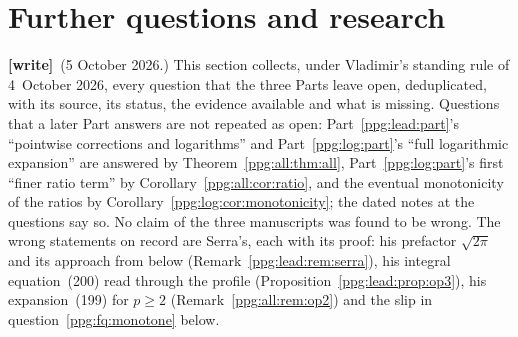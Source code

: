 \documentclass[11pt,letterpaper]{article}
\theoremstyle{remark}\newtheorem{remark}[theorem]{Remark}
\numberwithin{equation}{section}
\newcommand{\wtag}{\textup{\textbf{[write]}}}
\begin{document}
\section{Further questions and research}\label{ppg:sec:further}
\wtag\ (5 October 2026.) This section collects, under Vladimir's standing rule of 4~October 2026, every question that the three Parts leave open, deduplicated, with its source, its status, the evidence available and what is missing. Questions that a later Part answers are not repeated as open: Part~\ref{ppg:lead:part}'s ``pointwise corrections and logarithms'' and Part~\ref{ppg:log:part}'s ``full logarithmic expansion'' are answered by Theorem~\ref{ppg:all:thm:all}, Part~\ref{ppg:log:part}'s first ``finer ratio term'' by Corollary~\ref{ppg:all:cor:ratio}, and the eventual monotonicity of the ratios by Corollary~\ref{ppg:log:cor:monotonicity}; the dated notes at the questions say so. No claim of the three manuscripts was found to be wrong. The wrong statements on record are Serra's, each with its proof: his prefactor $\sqrt{2\pi}$ and its approach from below (Remark~\ref{ppg:lead:rem:serra}), his integral equation~(200) read through the profile (Proposition~\ref{ppg:lead:prop:op3}), his expansion~(199) for $p\ge2$ (Remark~\ref{ppg:all:rem:op2}) and the slip in question~\ref{ppg:fq:monotone} below.
\end{document}
